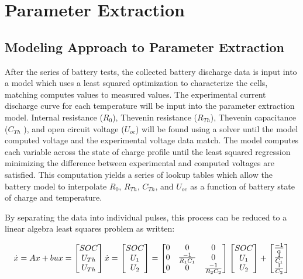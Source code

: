 \documentclass[]{aiaa-tc}%
\begin{document}
\section{Parameter Extraction}

\subsection{Modeling Approach to Parameter Extraction}

After the series of battery tests, the collected battery discharge data is input into a model which uses a least squared optimization to characterize the cells, matching computes values to measured values. The experimental current discharge curve for each temperature will be input into the parameter extraction model. Internal resistance ($R_{0}$), Thevenin resistance ($R_{Th}$), Thevenin capacitance ($C_{Th}$ ), and open circuit voltage ($U_{oc}$) will be found using a solver until the model computed voltage and the experimental voltage data match. The model computes each variable across the state of charge profile until the least squared regression minimizing the difference between experimental and computed voltages are satisfied. This computation yields a series of lookup tables which allow the battery model to interpolate $R_{0}$, $R_{Th}$, $C_{Th}$, and $U_{oc}$ as a function of battery state of charge and temperature. 

By separating the data into individual pulses, this process can be reduced to a linear algebra least squares problem as written:

\[
\dot{x} = Ax+bu \\
x = 
\begin{bmatrix}
    SOC \\
    U_{Th} \\
    U_{Th} \\
\end{bmatrix}
\\
\dot{x} = 
\begin{bmatrix}
    SOC \\
    U_{1} \\
    U_{2} \\
\end{bmatrix}
=
\begin{bmatrix}
    0 & 0 & 0 \\
    0 & \frac{-1}{R_{1}C_{1}} & 0 \\
   0 & 0 & \frac{-1}{R_{2}C_{2}} \\
\end{bmatrix}
\begin{bmatrix}
    SOC \\
    U_{1} \\
    U_{2} \\
\end{bmatrix}
+
\begin{bmatrix}
    \frac{-1}{\alpha} \\
    \frac{1}{C_{1}} \\
    \frac{1}{C_{2}} \\
\end{bmatrix}
\]
\end{document}
